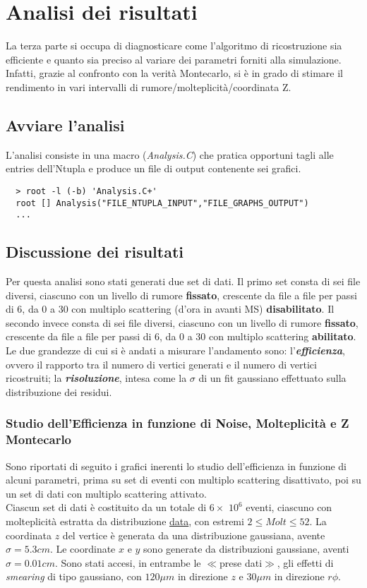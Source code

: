 \documentclass{article}
\begin{document}
\section{Analisi dei risultati}
La terza parte si occupa di diagnosticare come l'algoritmo di ricostruzione sia efficiente e quanto sia preciso al variare dei parametri forniti alla simulazione.
Infatti, grazie al confronto con la verità Montecarlo, si è in grado di stimare il rendimento in vari intervalli di rumore/molteplicità/coordinata Z. 
\subsection{Avviare l'analisi}
\noindent L'analisi consiste in una macro (\textit{Analysis.C}) che pratica opportuni tagli alle entries dell'Ntupla e produce un file di output contenente sei grafici.
\begin{verbatim}
  > root -l (-b) 'Analysis.C+'
  root [] Analysis("FILE_NTUPLA_INPUT","FILE_GRAPHS_OUTPUT")
  ...
\end{verbatim}

\subsection{Discussione dei risultati}
Per questa analisi sono stati generati due set di dati.
Il primo set consta di sei file diversi, ciascuno con un livello di rumore \textbf{fissato}, crescente da file a file per passi di 6, da 0 a 30 con multiplo scattering (d'ora in avanti MS) \textbf{disabilitato}.
Il secondo invece consta di sei file diversi, ciascuno con un livello di rumore \textbf{fissato}, crescente da file a file per passi di 6, da 0 a 30 con multiplo scattering \textbf{abilitato}.
Le due grandezze di cui si è andati a misurare l'andamento sono: l'\textbf{\textit{efficienza}}, ovvero il rapporto tra il numero di vertici generati e il numero di vertici ricostruiti; la \textbf{\textit{risoluzione}}, intesa come la $\sigma$ di un fit gaussiano effettuato sulla distribuzione dei residui.

\subsubsection{Studio dell'Efficienza in funzione di Noise, Molteplicità e Z Montecarlo}
Sono riportati di seguito i grafici inerenti lo studio dell'efficienza in funzione di alcuni parametri, prima su set di eventi con multiplo scattering disattivato, poi su un set di dati con multiplo scattering attivato.\\
\indent Ciascun set di dati è costituito da un totale di 
$6\times$ $10^{6}$ eventi, ciascuno con molteplicità estratta da distribuzione \href{http://personalpages.to.infn.it/~masera/tans/tans2013/miscellanea/kinem.root}{data}, con estremi $2\leq Molt \leq 52$. La coordinata $z$ del vertice è generata da una distribuzione gaussiana, avente $\sigma=5.3cm$. Le coordinate $x$ e $y$ sono generate da distribuzioni gaussiane, aventi $\sigma=0.01cm$. Sono stati accesi, in entrambe le $\ll$prese dati$\gg$, gli effetti di \textit{smearing} di tipo gaussiano, con $120 \mu m$ in direzione  $z$ e $30 \mu m$ in direzione $r\phi$. 
\end{document}
